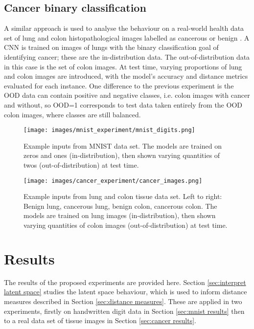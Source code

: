 \documentclass{article}
\begin{document}
\subsection{Cancer binary classification}
\label{sec:cancer method}
A similar approach is used to analyse the behaviour on a real-world health data set of lung and colon histopathological images labelled as cancerous or benign \cite{borkowski_lung_colon}. A CNN is trained on images of lungs with the binary classification goal of identifying cancer; these are the in-distribution data. The out-of-distribution data in this case is the set of colon images. At test time, varying proportions of lung and colon images are introduced, with the model's accuracy and distance metrics evaluated for each instance. One difference to the previous experiment is the OOD data can contain positive and negative classes, i.e. colon images with cancer and without, so OOD=1 corresponds to test data taken entirely from the OOD colon images, where classes are still balanced.


\begin{figure}[t]
  \centering
  \texttt{[image: images/mnist\_experiment/mnist\_digits.png]}
  \caption{Example inputs from MNIST data set. The models are trained on zeros and ones (in-distribution), then shown varying quantities of twos (out-of-distribution) at test time.}
  \label{mnist_inputs_image}
\end{figure}

\begin{figure}[t]
  \centering
  \texttt{[image: images/cancer\_experiment/cancer\_images.png]}
  \caption{Example inputs from lung and colon tissue data set. Left to right: Benign lung, cancerous lung, benign colon, cancerous colon. The models are trained on lung images (in-distribution), then shown varying quantities of colon images (out-of-distribution) at test time.}
  \label{cancer_inputs_image}
\end{figure}



\section{Results}
The results of the proposed experiments are provided here. Section \ref{sec:interpret latent space} studies the latent space behaviour, which is used to inform distance measures described in Section \ref{sec:distance measures}. These are applied in two experiments, firstly on handwritten digit data in Section \ref{sec:mnist results} then to a real data set of tissue images in Section \ref{sec:cancer results}.
\end{document}
